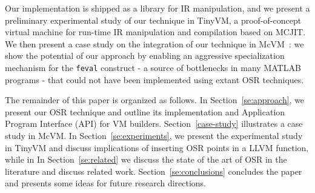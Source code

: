 Our implementation is shipped as a library for IR manipulation, and we present a preliminary experimental study of our technique in TinyVM, a proof-of-concept virtual machine for run-time IR manipulation and compilation based on MCJIT. We then present a case study on the integration of our technique in McVM~\cite{chevalier2010mcvm}: we show the potential of our approach by enabling an aggressive specialization mechanism for the {\tt feval} construct - a source of bottlenecks in many MATLAB programs - that could not have been implemented using extant OSR techniques.

The remainder of this paper is organized as follows. In Section~\ref{se:approach}, we present our OSR technique and outline its implementation and Application Program Interface (API) for VM builders. Section~\ref{case-study} illustrates a case study in McVM. In Section~\ref{se:experiments}, we present the experimental study in TinyVM and discuss implications of inserting OSR points in a LLVM function, while in In Section~\ref{se:related} we discuss the state of the art of OSR in the literature and discuss related work. Section~\ref{se:conclusions} concludes the paper and presents some ideas for future research directions. 
  
  
  
  